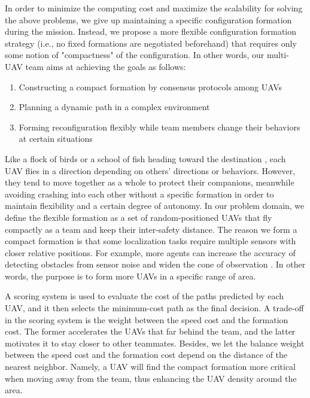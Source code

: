 In order to minimize the computing cost and maximize the scalability for solving the above problems, we give up maintaining a specific configuration formation during the mission. Instead, we propose a more flexible configuration formation strategy (i.e., no fixed formations are negotiated beforehand) that requires only some notion of "compactness" of the configuration. In other words, our multi-UAV team aims at achieving the goals as follows:
\begin{enumerate}
\item Constructing a compact formation by consensus protocols among UAVs
\item Planning a dynamic path in a complex environment
\item Forming reconfiguration flexibly while team members change their behaviors at certain situations
\end{enumerate}

Like a flock of birds or a school of fish heading toward the destination \citep{hubbard2004model}, each UAV flies in a direction depending on others' directions or behaviors. However, they tend to move together as a whole to protect their companions, meanwhile avoiding crashing into each other without a specific formation in order to maintain flexibility and a certain degree of autonomy. In our problem domain, we define the flexible formation as a set of random-positioned UAVs that fly compactly as a team and keep their inter-safety distance. The reason we form a compact formation is that some localization tasks require multiple sensors with closer relative positions. For example, more agents can increase the accuracy of detecting obstacles from sensor noise and widen the cone of observation \citep{anderson2008uav}. In other words, the purpose is to form more UAVs in a specific range of area.

A scoring system is used to evaluate the cost of the paths predicted by each UAV, and it then selects the minimum-cost path as the final decision. A trade-off in the scoring system is the weight between the speed cost and the formation cost. The former accelerates the UAVs that far behind the team, and the latter motivates it to stay closer to other teammates. Besides, we let the balance weight between the speed cost and the formation cost depend on the distance of the nearest neighbor. Namely, a UAV will find the compact formation more critical when moving away from the team, thus enhancing the UAV density around the area.

